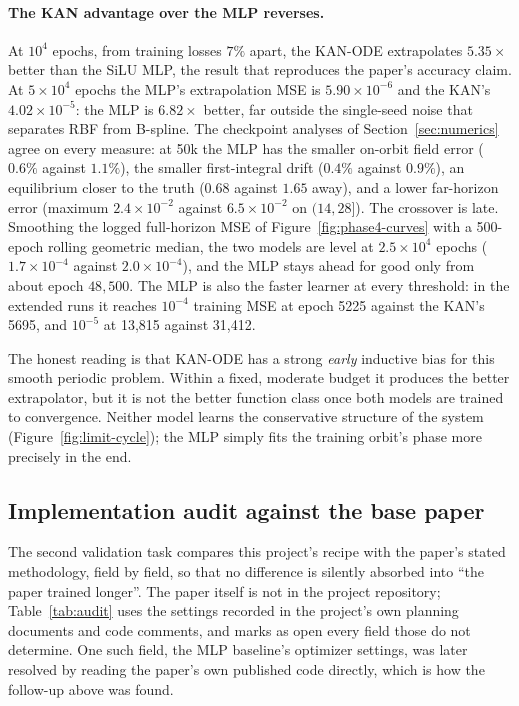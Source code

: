 \paragraph{The KAN advantage over the MLP reverses.} At $10^4$ epochs, from
training losses $7\%$ apart, the KAN-ODE extrapolates $5.35\times$ better
than the SiLU MLP, the result that reproduces the paper's accuracy claim. At
$5\times10^4$ epochs the MLP's extrapolation MSE is $5.90\times10^{-6}$ and
the KAN's $4.02\times10^{-5}$: the MLP is $6.82\times$ better, far outside
the single-seed noise that separates RBF from B-spline. The checkpoint
analyses of Section~\ref{sec:numerics} agree on every measure: at 50k the MLP
has the smaller on-orbit field error ($0.6\%$ against $1.1\%$), the smaller
first-integral drift ($0.4\%$ against $0.9\%$), an equilibrium closer to the
truth ($0.68$ against $1.65$ away), and a lower far-horizon error
(maximum $2.4\times10^{-2}$ against $6.5\times10^{-2}$ on $(14,28]$). The
crossover is late. Smoothing the logged full-horizon MSE of
Figure~\ref{fig:phase4-curves} with a 500-epoch rolling geometric median,
the two models are level at $2.5\times10^4$
epochs ($1.7\times10^{-4}$ against $2.0\times10^{-4}$), and the MLP stays
ahead for good only from about epoch $48{,}500$. The MLP is also the faster
learner at every threshold: in the extended runs it reaches $10^{-4}$
training MSE at epoch 5225 against the KAN's 5695, and $10^{-5}$ at 13{,}815
against 31{,}412.

The honest reading is that KAN-ODE has a strong \emph{early} inductive bias
for this smooth periodic problem. Within a fixed, moderate budget it produces
the better extrapolator, but it is not the better function class once both
models are trained to convergence. Neither model learns the conservative
structure of the system (Figure~\ref{fig:limit-cycle}); the MLP simply fits
the training orbit's phase more precisely in the end.

\subsection{Implementation audit against the base paper}
\label{sec:audit}

The second validation task compares this project's recipe with the paper's
stated methodology, field by field, so that no difference is silently
absorbed into ``the paper trained longer''. The paper itself is not in the
project repository; Table~\ref{tab:audit} uses the settings recorded in the
project's own planning documents and code comments, and marks as open every
field those do not determine. One such field, the MLP baseline's optimizer
settings, was later resolved by reading the paper's own published code
directly, which is how the follow-up above was found.

